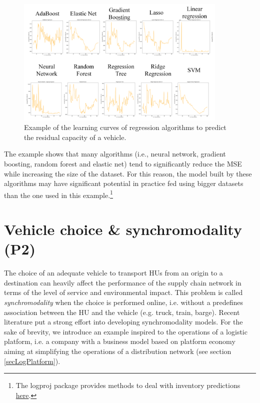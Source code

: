 \begin{figure}[hbt!]
\centering
\includegraphics[width=0.9\textwidth]{SectionDistribution/control_figures/fig_learningCurves.png}
\captionsetup{type=figure}
\caption{Example of the learning curves of regression algorithms to predict the residual capacity of a vehicle.}
\label{fig_learningCurves}
\end{figure}

The example shows that many algorithms (i.e., neural network, gradient boosting, random forest and elastic net) tend to significantly reduce the MSE while increasing the size of the dataset. For this reason, the model built by these algorithms may have significant potential in practice fed using bigger datasets than the one used in this example.\footnote{The logproj package provides methods to deal with inventory predictions \href{https://github.com/aletuf93/logproj/blob/master/examples/LOG_02\%20Demand\%20prediction.ipynb}{here}.}


\section{Vehicle choice \& synchromodality (P2)}

The choice of an adequate vehicle to transport HUs from an origin to a destination can heavily affect the performance of the supply chain network in terms of the level of service and environmental impact. This problem is called \textit{synchromodality} when the choice is performed online, i.e. without a predefines association between the HU and the vehicle (e.g. truck, train, barge). Recent literature put a strong effort into developing synchromodality models. For the sake of brevity, we introduce an example inspired to the operations of a logistic platform, i.e. a company with a business model based on platform economy aiming at simplifying the operations of a distribution network (see section \ref{secLogPlatform}). \par

